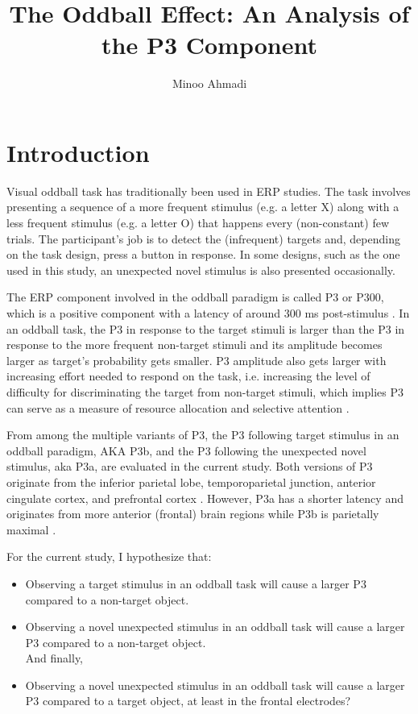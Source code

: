 \documentclass[a4paper,man,natbib]{apa6}
\title{The Oddball Effect: An Analysis of the P3 Component}
\author{Minoo Ahmadi}
\affiliation{Neuroscience and Cognitive Science program\\ University of Maryland}
\begin{document}
\maketitle

\section{Introduction}

Visual oddball task has traditionally been used in ERP studies. The task involves presenting a sequence of a more frequent stimulus (e.g. a letter X) along with a less frequent stimulus (e.g. a letter O) that happens every (non-constant) few trials. The participant’s job is to detect the (infrequent) targets and, depending on the task design, press a button in response. In some designs, such as the one used in this study, an unexpected novel stimulus is also presented occasionally.

The ERP component involved in the oddball paradigm is called P3 or P300, which is a positive component with a latency of around 300 ms post-stimulus \citep{Pritchard1981PsychophysiologyP300}. In an oddball task, the P3 in response to the target stimuli is larger than the P3 in response to the more frequent non-target stimuli and its amplitude becomes larger as target's probability gets smaller. P3 amplitude also gets larger with increasing effort needed to respond on the task, i.e. increasing the level of difficulty for discriminating the target from non-target stimuli, which implies P3 can serve as a measure of resource allocation and selective attention \citep{Luck2014AnOrigins}.

From among the multiple variants of P3, the P3 following target stimulus in an oddball paradigm, AKA P3b, and the P3 following the unexpected novel stimulus, aka P3a, are evaluated in the current study. Both versions of P3 originate from the inferior parietal lobe, temporoparietal junction, anterior cingulate cortex, and prefrontal cortex \citep{Linden2005TheUs}. However, P3a has a shorter latency and originates from more anterior (frontal) brain regions \citep{Nelson2011OperationalizingPhenotype} while P3b is parietally maximal \citep{Luck2014AnOrigins}.

For the current study, I hypothesize that: 
\begin{itemize}
\item Observing a target stimulus in an oddball task will cause a larger P3 compared to a non-target object.
\item Observing a novel unexpected stimulus in an oddball task will cause a larger P3 compared to a non-target object.\\
And finally,
\item Observing a novel unexpected stimulus in an oddball task will cause a larger P3 compared to a target object, at least in the frontal electrodes?
\end{itemize}
   
\end{document}
